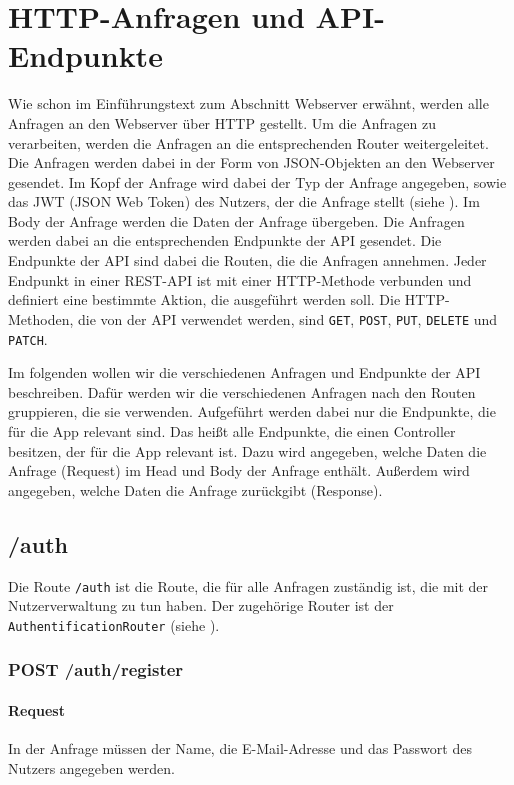 \documentclass{entwurfsheft}
\begin{document}
\section{HTTP-Anfragen und API-Endpunkte}
Wie schon im Einführungstext zum Abschnitt Webserver erwähnt, werden alle Anfragen an den Webserver über HTTP gestellt.
Um die Anfragen zu verarbeiten, werden die Anfragen an die entsprechenden Router weitergeleitet.
Die Anfragen werden dabei in der Form von JSON-Objekten an den Webserver gesendet.
Im Kopf der Anfrage wird dabei der Typ der Anfrage angegeben, sowie das JWT (JSON Web Token) des Nutzers, der die Anfrage stellt (siehe ).
Im Body der Anfrage werden die Daten der Anfrage übergeben.
Die Anfragen werden dabei an die entsprechenden Endpunkte der API gesendet.
Die Endpunkte der API sind dabei die Routen, die die Anfragen annehmen.
Jeder Endpunkt in einer REST-API ist mit einer HTTP-Methode verbunden und definiert eine bestimmte Aktion, die ausgeführt werden soll.
Die HTTP-Methoden, die von der API verwendet werden, sind \texttt{GET}, \texttt{POST}, \texttt{PUT}, \texttt{DELETE} und \texttt{PATCH}.

Im folgenden wollen wir die verschiedenen Anfragen und Endpunkte der API beschreiben.
Dafür werden wir die verschiedenen Anfragen nach den Routen gruppieren, die sie verwenden.
Aufgeführt werden dabei nur die Endpunkte, die für die App relevant sind. 
Das heißt alle Endpunkte, die einen Controller besitzen, der für die App relevant ist.
Dazu wird angegeben, welche Daten die Anfrage (Request) im Head und Body der Anfrage enthält.
Außerdem wird angegeben, welche Daten die Anfrage zurückgibt (Response).

\subsection{/auth}
Die Route \texttt{/auth} ist die Route, die für alle Anfragen zuständig ist, die mit der Nutzerverwaltung zu tun haben.
Der zugehörige Router ist der \texttt{AuthentificationRouter} (siehe ).

\subsubsection*{POST /auth/register}
\paragraph{Request}
In der Anfrage müssen der Name, die E-Mail-Adresse und das Passwort des Nutzers angegeben werden.
\end{document}
